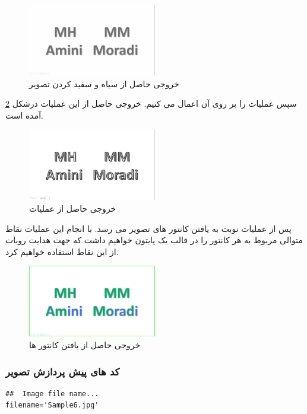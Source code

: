 \documentclass{article}
\begin{document}
{\begin{figure}[h!]
  \centering 
  \includegraphics[width=0.5\textwidth]{GrayscaleSample6.jpg}
  \caption{خروجی حاصل از سیاه و سفید کردن تصویر}
  \label{fig:Grayscaled}
 \end{figure}
سپس عملیات 
را بر روی آن اعمال می کنیم. خروجی حاصل از این عملیات درشکل
\ref{fig:Thresholded}
آمده است.
 \begin{figure}[h!]
  \centering 
  \includegraphics[width=0.5\textwidth]{ThresholdedSample6.jpg}
  \caption{خروجی حاصل از عملیات 
  }
  \label{fig:Thresholded}
 \end{figure}
پس از عملیات
نوبت به یافتن کانتور های تصویر می رسد. با انجام این عملیات نقاط متوالی مربوط به هر کانتور را در قالب یک 
پایتون خواهیم داشت که جهت هدایت روبات از این نقاط استفاده خواهیم کرد.

 \begin{figure}[h!]
  \centering 
  \includegraphics[width=0.5\textwidth]{ContoursSample6.jpg}
  \caption{خروجی حاصل از یافتن کانتور ها }
  \label{fig:Contours}
 \end{figure}
\pagebreak
\subsubsection{کد های پیش پردازش تصویر}
\begin{lstlisting}
##  Image file name...
filename='Sample6.jpg'


\end{lstlisting}}
\end{document}
